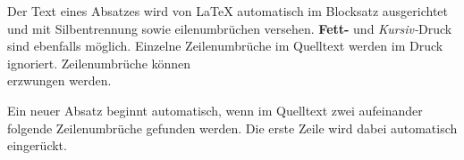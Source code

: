 Der Text eines Absatzes wird von LaTeX automatisch im
Blocksatz ausgerichtet und mit Silbentrennung sowie
eilenumbrüchen versehen. \textbf{Fett-} und
\textit{Kursiv-}Druck sind ebenfalls möglich.
Einzelne Zeilenumbrüche im Quelltext werden im Druck ignoriert.
Zeilenumbrüche können\\
erzwungen \newline
werden.

Ein neuer Absatz beginnt automatisch, wenn im Quelltext zwei
aufeinander folgende Zeilenumbrüche gefunden werden. Die erste
Zeile wird dabei automatisch eingerückt.
